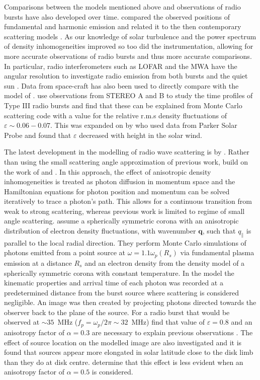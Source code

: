 Comparisons between the models mentioned above and observations of radio bursts have also developed over time. \cite{Stewart1972} compared the observed positions of fundamental and harmonic emission and related it to the then contemporary scattering models \citep[e.g.][]{Fokker1965,Steinberg1971,Riddle1974}. As our knowledge of solar turbulence and the power spectrum of density inhomogeneities improved so too did the instrumentation, allowing for more accurate observations of radio bursts and thus more accurate comparisons. In particular, radio interferometers such as LOFAR and the MWA have the angular resolution to investigate radio emission from both bursts \citep{Zhang2020} and the quiet sun \citep{Sharma2020}. Data from space-craft has also been used to directly compare with the model of \cite{Thejappa2007}. \cite{Krupar2018} use observations from STEREO A and B to study the time profiles of Type III radio bursts and find that these can be explained from Monte Carlo scattering code with a value for the relative r.m.s density fluctuations of $\varepsilon \sim 0.06-0.07$. This was expanded on by \cite{Krupar2020} who used data from Parker Solar Probe and found that $\varepsilon$ decreased with height in the solar wind.

The latest development in the modelling of radio wave scattering is by \cite{Kontar2019}. Rather than using the small scattering angle approximation of previous work, \cite{Kontar2019} build on the work of \cite{Arzner1999} and \cite{Bian2019}. In this approach, the effect of anisotropic density inhomogeneities is treated as photon diffusion in momentum space and the Hamiltonian equations for photon position and momentum can be solved iteratively to trace a photon's path. This allows for a continuous transition from weak to strong scattering, whereas previous work is limited to regime of small angle scattering. \cite{Kontar2019} assume a spherically symmetric corona with an anisotropic distribution of electron density fluctuations, with wavenumber $\mathbf{q}$, such that $q_\parallel$ is parallel to the local radial direction. They perform Monte Carlo simulations of photons emitted from a point source at $\omega = 1.1 \omega_p(R_s)$ via fundamental plasma emission at a distance $R_s$ and an electron density from the \cite{Parker1960} density model of a spherically symmetric corona with constant temperature. In the \cite{Kontar2019} model the kinematic properties and arrival time of each photon was recorded at a predetermined distance from the burst source where scattering is considered negligible. An image was then created by projecting photons directed towards the observer back to the plane of the source. For a radio burst that would be observed at $\sim 35$~MHz ($f_p = \omega_p/2 \pi \sim 32$~MHz) \cite{Kontar2019} find that value of $\varepsilon = 0.8$ and an anisotropy factor of $\alpha = 0.3$ are necessary to explain previous observations \citep{Kontar2017}. The effect of source location on the modelled image are also investigated and it is found that sources appear more elongated in solar latitude close to the disk limb than they do at disk centre. \cite{Kontar2019} determine that this effect is less evident when an anisotropy factor of $\alpha = 0.5$ is considered.

